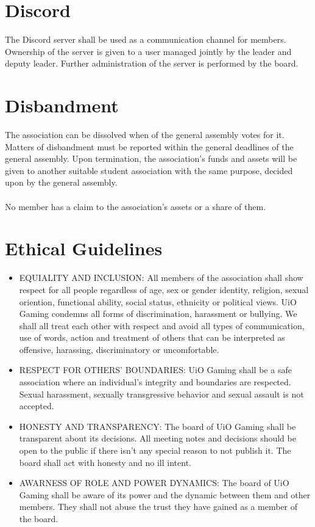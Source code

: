 \documentclass[12pt,a4paper,norsk]{article}
\begin{document}
\section{Discord}

The Discord server  shall be used as a communication channel for members. Ownership of the server is given to a user managed jointly by the leader and deputy leader. Further administration of the server is performed by the board.



\section{Disbandment}

The association can be dissolved when  of the general assembly votes for it. Matters of disbandment must be reported within the general deadlines of the general assembly. Upon termination, the association's funds and assets will be given to another suitable student association with the same purpose, decided upon by the general assembly.
\\
\\
No member has a claim to the association's assets or a share of them.



\section{Ethical Guidelines}

\begin{itemize}
    \item EQUIALITY AND INCLUSION:
        All members of the association shall show respect for all people regardless of age, sex or gender identity, religion, sexual oriention, functional ability, social status, ethnicity or political views. UiO Gaming condemns all forms of discrimination, harassment or bullying. We shall all treat each other with respect and avoid all types of communication, use of words, action and treatment of others that can be interpreted as offensive, harassing, discriminatory or uncomfortable.
    
    \item RESPECT FOR OTHERS' BOUNDARIES:
        UiO Gaming shall be a safe association where an individual's integrity and boundaries are respected. Sexual harassment, sexually transgressive behavior and sexual assault is not accepted.

    \item HONESTY AND TRANSPARENCY:
    The board of UiO Gaming shall be transparent about its decisions. All meeting notes and decisions should be open to the public if there isn't any special reason to not publish it. The board shall act with honesty and no ill intent.

    \item AWARNESS OF ROLE AND POWER DYNAMICS:
    The board of UiO Gaming shall be aware of its power and the dynamic between them and other members. They shall not abuse the trust they have gained as a member of the board.
\end{itemize}
\end{document}
